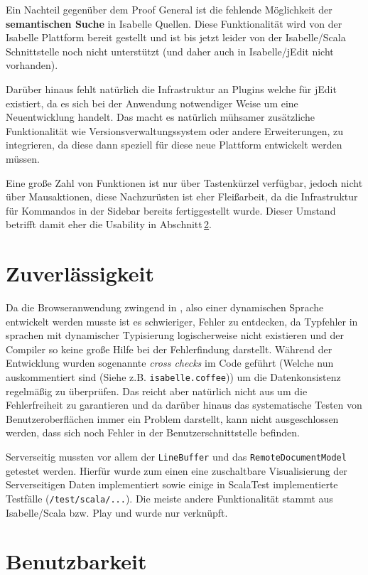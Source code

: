 Ein Nachteil gegenüber dem Proof General ist die fehlende Möglichkeit der \textbf{semantischen
Suche} in Isabelle Quellen. Diese Funktionalität wird von der Isabelle Plattform bereit gestellt und
ist bis jetzt leider von der Isabelle/Scala Schnittstelle noch nicht unterstützt (und daher auch in
Isabelle/jEdit nicht vorhanden).

Darüber hinaus fehlt natürlich die Infrastruktur an Plugins welche für jEdit existiert, da es sich
bei der Anwendung notwendiger Weise um eine Neuentwicklung handelt. Das macht es natürlich mühsamer
zusätzliche Funktionalität wie Versionsverwaltungssystem oder andere Erweiterungen, zu integrieren,
da diese dann speziell für diese neue Plattform entwickelt werden müssen.

Eine große Zahl von Funktionen ist nur über Tastenkürzel verfügbar, jedoch nicht über Mausaktionen,
diese Nachzurüsten ist eher Fleißarbeit, da die Infrastruktur für Kommandos in der Sidebar bereits
fertiggestellt wurde. Dieser Umstand betrifft damit eher die Usability in
Abschnitt\,\ref{sec:usability}.

\section{Zuverlässigkeit}

Da die Browseranwendung zwingend in , also einer dynamischen Sprache entwickelt werden
musste ist es schwieriger, Fehler zu entdecken, da Typfehler in sprachen mit dynamischer Typisierung
logischerweise nicht existieren und der Compiler so keine große Hilfe bei der Fehlerfindung
darstellt. Während der Entwicklung wurden sogenannte \textit{cross checks} im Code geführt (Welche
nun auskommentiert sind (Siehe z.B. \texttt{isabelle.coffee})) um die Datenkonsistenz regelmäßig zu
überprüfen. Das reicht aber natürlich nicht aus um die Fehlerfreiheit zu garantieren und da darüber
hinaus das systematische Testen von Benutzeroberflächen immer ein Problem darstellt, kann nicht
ausgeschlossen werden, dass sich noch Fehler in der Benutzerschnittstelle befinden.

Serverseitig mussten vor allem der \texttt{LineBuffer} und das \texttt{RemoteDocumentModel} getestet
werden. Hierfür wurde zum einen eine zuschaltbare Visualisierung der Serverseitigen Daten
implementiert sowie einige in ScalaTest implementierte Testfälle (\texttt{/test/scala/...}). Die
meiste andere Funktionalität stammt aus Isabelle/Scala bzw. Play und wurde nur verknüpft.

\section{Benutzbarkeit}
\label{sec:usability}

